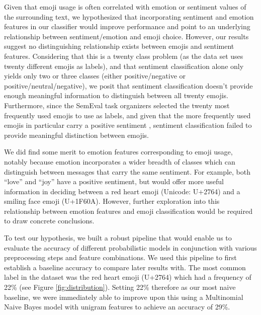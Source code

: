 \documentclass[11pt]{article}
\begin{document}
Given that emoji usage is often correlated with emotion or sentiment values of the surrounding text, we hypothesized that incorporating sentiment and emotion features in our classifier would improve performance and point to an underlying relationship between sentiment/emotion and emoji choice. However, our results suggest no distinguishing relationship exists between emojis and sentiment features. Considering that this is a twenty class problem (as the data set uses twenty different emojis as labels), and that sentiment classification alone only yields only two or three classes (either positive/negative or positive/neutral/negative), we posit that sentiment classification doesn't provide enough meaningful information to distinguish between all twenty emojis. Furthermore, since the SemEval task organizers selected the twenty most frequently used emojis to use as labels, and given that the more frequently used emojis in particular carry a positive sentiment \cite{novak2015sentiment}, sentiment classification failed to provide meaningful distinction between emojis.

We did find some merit to emotion features corresponding to emoji usage, notably because emotion incorporates a wider breadth of classes which can distinguish between messages that carry the same sentiment. For example, both ``love'' and ``joy'' have a positive sentiment, but would offer more useful information in deciding between a red heart emoji (Unicode: U+2764) and a smiling face emoji (U+1F60A). However, further exploration into this relationship between emotion features and emoji classification would be required to draw concrete conclusions.

To test our hypothesis, we built a robust pipeline that would enable us to evaluate the accuracy of different probabilistic models in conjunction with various preprocessing steps and feature combinations. We used this pipeline to first establish a baseline accuracy to compare later results with. The most common label in the dataset was the red heart emoji (U+2764) which had a frequency of 22\% (see Figure \ref{fig:distribution}). Setting 22\% therefore as our most naive baseline, we were immediately able to improve upon this using a Multinomial Naive Bayes model with unigram features to achieve an accuracy of 29\%.
\end{document}
